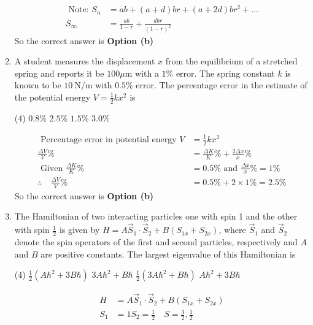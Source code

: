 \begin{enumerate}
\begin{answer}
\begin{align*}
\text { Note: } S_{n}&=a b+(a+d) b r+(a+2 d) b r^{2}+\ldots\\
S_{\infty}&=\frac{a b}{1-r}+\frac{d b r}{(1-r)^{2}}
	\end{align*}
		So the correct answer is \textbf{Option (b)}
\end{answer}
\item A student measures the displacement $x$ from the equilibrium of a stretched spring and reports it be $100 \mu \mathrm{m}$ with a $1 \%$ error. The spring constant $k$ is known to be $10 \mathrm{~N} / \mathrm{m}$ with $0.5 \%$ error. The percentage error in the estimate of the potential energy $V=\frac{1}{2} k x^{2}$ is
 \begin{tasks}(4)
	\task[\textbf{a.}]$0.8 \%$
	\task[\textbf{b.}] $2.5 \%$
	\task[\textbf{c.}] $1.5 \%$
	\task[\textbf{d.}] $3.0 \%$ 
\end{tasks}
\begin{answer}
	\begin{align*}
	\text { Percentage error in potential energy } V&=\frac{1}{2} k x^{2}\\
	\frac{\Delta V}{V} \%&=\frac{\Delta K}{K} \%+\frac{2 \Delta x}{x} \%\\
\text{	Given }\frac{\Delta K}{K} \%&=0.5 \%\text{ and }\frac{\Delta x}{x} \%=1 \%\\
	\therefore \quad \frac{\Delta V}{V} \%&=0.5 \%+2 \times 1 \%=2.5 \%
	\end{align*}
		So the correct answer is \textbf{Option (b)}
\end{answer}
\item The Hamiltonian of two interacting particles one with spin 1 and the other with spin $\frac{1}{2}$ is given by $H=A \vec{S}_{1} \cdot \vec{S}_{2}+B\left(S_{1 x}+S_{2 x}\right)$, where $\vec{S}_{1}$ and $\vec{S}_{2}$ denote the spin operators of the first and second particles, respectively and $A$ and $B$ are positive constants. The largest eigenvalue of this Hamiltonian is
 \begin{tasks}(4)
	\task[\textbf{a.}] $\frac{1}{2}\left(A \hbar^{2}+3 B \hbar\right)$
	\task[\textbf{b.}]$3 A \hbar^{2}+B \hbar$
	\task[\textbf{c.}] $\frac{1}{2}\left(3 A \hbar^{2}+B \hbar\right)$
	\task[\textbf{d.}]  $A \hbar^{2}+3 B \hbar$	
\end{tasks}
\begin{answer}
	\begin{align*}
	H&=A \vec{S}_{1} \cdot \vec{S}_{2}+B\left(S_{1 x}+S_{2 x}\right)\\
	S_{1}&=1 S_{2}=\frac{1}{2} \quad S=\frac{3}{2}, \frac{1}{2} \\

\end{align*}
\end{answer}
\end{enumerate}
